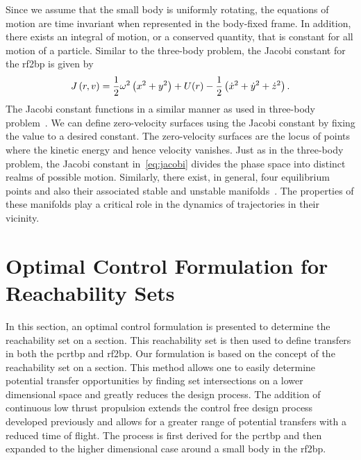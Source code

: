 Since we assume that the small body is uniformly rotating, the equations of motion are time invariant when represented in the body-fixed frame.
In addition, there exists an integral of motion, or a conserved quantity, that is constant for all motion of a particle.
Similar to the three-body problem, the Jacobi constant for the \gls{rf2bp} is given by
\begin{align}\label{eq:jacobi}
    J \left( r, v \right) = \frac{1}{2} \omega^2 \left( x^2 + y^2 \right) + U(r) - \frac{1}{2} \left( \dot{x}^2 + \dot{y}^2 + \dot{z}^2 \right) .
\end{align}
The Jacobi constant functions in a similar manner as used in three-body problem~\cite{szebehely1967}.
We can define zero-velocity surfaces using the Jacobi constant by fixing the value to a desired constant.
The zero-velocity surfaces are the locus of points where the kinetic energy and hence velocity vanishes.
Just as in the three-body problem, the Jacobi constant in~\cref{eq:jacobi} divides the phase space into distinct realms of possible motion.
Similarly, there exist, in general, four equilibrium points and also their associated stable and unstable manifolds~\cite{scheeres1996,scheeres1994}.
The properties of these manifolds play a critical role in the dynamics of trajectories in their vicinity.

\section{Optimal Control Formulation for Reachability Sets}\label{sec:optimal_control}
In this section, an optimal control formulation is presented to determine the reachability set on a \Poincare section.
This reachability set is then used to define transfers in both the \gls{pcrtbp} and \gls{rf2bp}.
Our formulation is based on the concept of the reachability set on a \Poincare section.
This method allows one to easily determine potential transfer opportunities by finding set intersections on a lower dimensional space and greatly reduces the design process.
The addition of continuous low thrust propulsion extends the control free design process developed previously and allows for a greater range of potential transfers with a reduced time of flight.
The process is first derived for the \gls{pcrtbp} and then expanded to the higher dimensional case around a small body in the \gls{rf2bp}.

